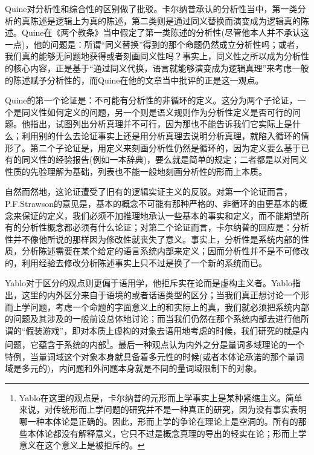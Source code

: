 \documentclass{article}
\begin{document}
Quine对分析性和综合性的区别做了批驳。卡尔纳普承认的分析性当中，第一类分析的真陈述是逻辑上为真的陈述，第二类则是通过同义替换而演变成为逻辑真的陈述。Quine在《两个教条》当中假定了第一类陈述的分析性(尽管他本人并不承认这一点)，他的问题是：所谓“同义替换”得到的那个命题仍然成立分析性吗；或者，我们真的能够无问题地获得或者刻画同义性吗？事实上，同义性之所以成为分析性的核心内容，正是基于“通过同义代换，语言就能够演变成为逻辑真理”来考虑一般的陈述赋予分析性的，而Quine在他的文章当中批评的正是这一观点。

Quine的第一个论证是：不可能有分析性的非循环的定义。这分为两个子论证，一个是同义性如何定义的问题，另一个则是语义规则作为分析性定义是否可行的问题。他指出，试图列出分析真理并不可行，因为那也不能告诉我们它实际上是什么；利用别的什么去论证事实上还是用分析真理去说明分析真理，就陷入循环的情形了。第二个子论证是，用定义来刻画分析性仍然是循环的，因为定义要么基于已有的同义性的经验报告(例如一本辞典)，要么就是简单的规定；二者都是以对同义性质的先验理解为基础，列表也不能一般地刻画分析性的形而上本质。

自然而然地，这论证遭受了旧有的逻辑实证主义的反驳。对第一个论证而言，P.F.Strawson的意见是，基本的概念不可能有那种严格的、非循环的由更基本的概念来保证的定义，我们必须不加推理地承认一些基本的事实和定义，而不能期望所有的分析性概念都必须有什么论证；对第二个论证而言，卡尔纳普的回应是：分析性并不像他所说的那样因为修改性就丧失了意义。事实上，分析性是系统内部的性质，分析陈述需要在某个给定的语言系统内部来定义；因而分析性并不是不可修改的，利用经验去修改分析陈述事实上只不过是换了一个新的系统而已。

Yablo对于区分的观点则更偏于语用学，他拒斥实在论而是虚构主义者。Yablo指出，这里的内外区分来自于语境的或者话语类型的区分；当我们真正想讨论一个形而上学问题，考虑一个命题的字面意义上的和实际上的真，我们就必须把系统内部的问题及其涉及的一般前设总体地讨论；而当我们仍然在那个系统内部去进行他所谓的“假装游戏”，即对本质上虚构的对象去语用地考虑的时候，我们研究的就是内问题，它蕴含于系统的内部\footnote{Yablo在这里的观点是，卡尔纳普的元形而上学事实上是某种紧缩主义。简单来说，对传统形而上学问题的研究并不是一种真正的研究，因为没有事实表明哪一种本体论是正确的。因此，形而上学的争论在理论上是空洞的。所有的那些本体论都没有解释意义，它只不过是概念真理的导出的轻实在论；形而上学意义在这个意义上是被拒斥的。}。最后一种观点认为内外之分是量词多域理论的一个特例，当量词域这个对象本身就具备着多元性的时候(或者本体论承诺的那个量词域是多元的)，内问题和外问题本身就是不同的量词域限制下的对象。
\end{document}
